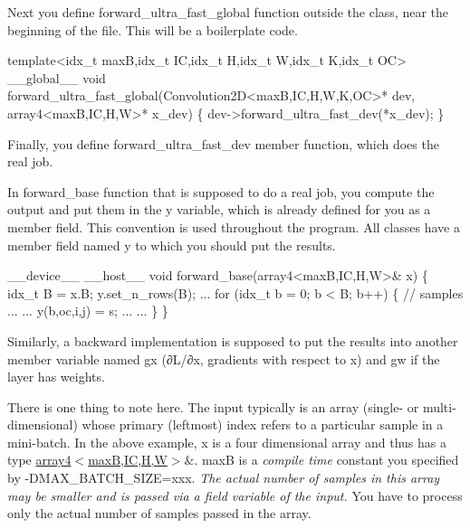 Next you define forward\+\_\+ultra\+\_\+fast\+\_\+global function outside the class, near the beginning of the file. This will be a boilerplate code.


\begin{DoxyCode}
template<idx\_t maxB,idx\_t IC,idx\_t H,idx\_t W,idx\_t K,idx\_t OC>
\_\_global\_\_ void forward\_ultra\_fast\_global(Convolution2D<maxB,IC,H,W,K,OC>* dev,
                                          array4<maxB,IC,H,W>* x\_dev) \{
  dev->forward\_ultra\_fast\_dev(*x\_dev);
\}
\end{DoxyCode}


Finally, you define forward\+\_\+ultra\+\_\+fast\+\_\+dev member function, which does the real job.

In forward\+\_\+base function that is supposed to do a real job, you compute the output and put them in the \textquotesingle{}y\textquotesingle{} variable, which is already defined for you as a member field. This convention is used throughout the program. All classes have a member field named \textquotesingle{}y\textquotesingle{} to which you should put the results.


\begin{DoxyCode}
\_\_device\_\_ \_\_host\_\_ 
void forward\_base(array4<maxB,IC,H,W>& x) \{
  idx\_t B = x.B;
  y.set\_n\_rows(B);
  ...
  for (idx\_t b = 0; b < B; b++) \{       // samples
    ...
       ...
          y(b,oc,i,j) = s;
       ...
    ...
  \}
\}
\end{DoxyCode}


Similarly, a backward implementation is supposed to put the results into another member variable named \textquotesingle{}gx\textquotesingle{} (∂\+L/∂x, gradients with respect to x) and \textquotesingle{}gw\textquotesingle{} if the layer has weights.

There is one thing to note here. The input typically is an array (single-\/ or multi-\/dimensional) whose primary (leftmost) index refers to a particular sample in a mini-\/batch. In the above example, x is a four dimensional array and thus has a type \hyperlink{structarray4}{array4$<$max\+B,\+I\+C,\+H,\+W$>$}\&. maxB is a {\itshape compile time} constant you specified by -\/\+D\+M\+A\+X\+\_\+\+B\+A\+T\+C\+H\+\_\+\+S\+I\+ZE=xxx. {\itshape The actual number of samples in this array may be smaller and is passed via a field variable of the input.} You have to process only the actual number of samples passed in the array.

